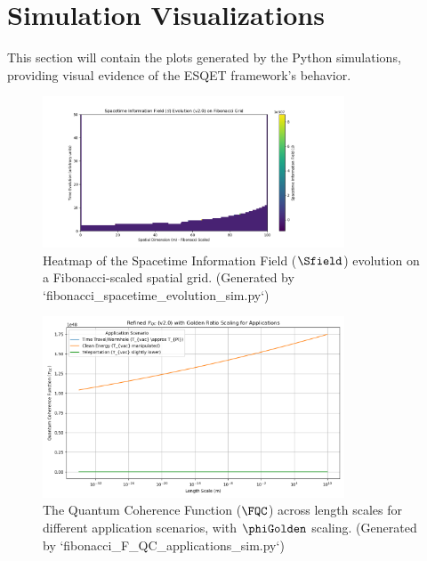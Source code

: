 \section{Simulation Visualizations}
This section will contain the plots generated by the Python simulations, providing visual evidence of the ESQET framework's behavior.

\begin{figure}[h!]
    \centering
    \includegraphics[width=0.8\textwidth]{figures/fibonacci_spacetime_evolution_v2.png} %
    \caption{Heatmap of the Spacetime Information Field ($\Sfield$) evolution on a Fibonacci-scaled spatial grid. (Generated by `fibonacci_spacetime_evolution_sim.py`)}
    \label{fig:s_evolution_v2}
\end{figure}

\begin{figure}[h!]
    \centering
    \includegraphics[width=0.8\textwidth]{figures/fibonacci_F_QC_applications_v2.png} %
    \caption{The Quantum Coherence Function ($\FQC$) across length scales for different application scenarios, with $\phiGolden$ scaling. (Generated by `fibonacci_F_QC_applications_sim.py`)}
    \label{fig:fqc_applications_v2}
\end{figure}

